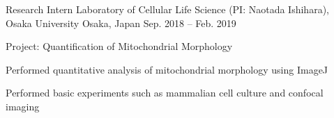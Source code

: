 \begin{cventries}
  \cventry
    {Research Intern} %
    {Laboratory of Cellular Life Science (PI: Naotada Ishihara), Osaka University} %
    {Osaka, Japan} %
    {Sep. 2018 – Feb. 2019} %
    {
      \begin{cvitems} %
        \item {Project: Quantification of Mitochondrial Morphology}
        \item {Performed quantitative analysis of mitochondrial morphology using ImageJ}
        \item {Performed basic experiments such as mammalian cell culture and confocal imaging}
      \end{cvitems}
    }


\end{cventries}
